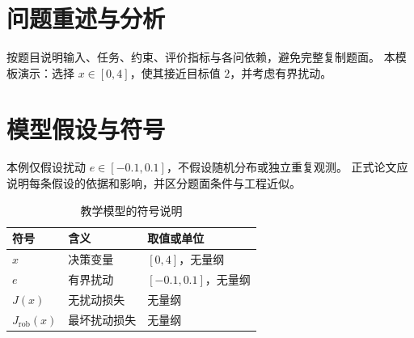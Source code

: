 \section{问题重述与分析}
按题目说明输入、任务、约束、评价指标与各问依赖，避免完整复制题面。
本模板演示：选择 $x\in[0,4]$，使其接近目标值 $2$，并考虑有界扰动。

\section{模型假设与符号}
本例仅假设扰动 $e\in[-0.1,0.1]$，不假设随机分布或独立重复观测。
正式论文应说明每条假设的依据和影响，并区分题面条件与工程近似。
\begin{table}[htbp]
\centering
\caption{教学模型的符号说明}
\begin{tabularx}{\linewidth}{lXl}
\toprule 符号 & 含义 & 取值或单位 \\
\midrule
$x$ & 决策变量 & $[0,4]$，无量纲 \\
$e$ & 有界扰动 & $[-0.1,0.1]$，无量纲 \\
$J(x)$ & 无扰动损失 & 无量纲 \\
$J_{\mathrm{rob}}(x)$ & 最坏扰动损失 & 无量纲 \\
\bottomrule
\end{tabularx}
\end{table}
